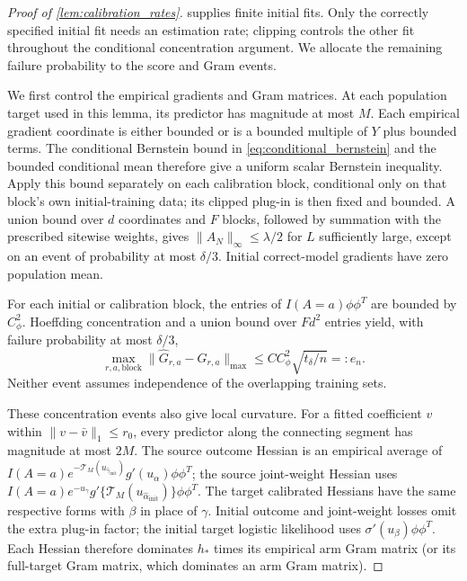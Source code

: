 \documentclass[12pt]{article}
\begin{document}
\begin{proof}[Proof of \cref{lem:calibration_rates}]
 supplies finite initial fits. Only the correctly specified initial fit needs an estimation rate; clipping controls the other fit throughout the conditional concentration argument. We allocate the remaining failure probability to the score and Gram events.

We first control the empirical gradients and Gram matrices. At each population target used in this lemma, its predictor has magnitude at most $M$. Each empirical gradient coordinate is either bounded or is a bounded multiple of $Y$ plus bounded terms. The conditional Bernstein bound in \cref{eq:conditional_bernstein} and the bounded conditional mean therefore give a uniform scalar Bernstein inequality. Apply this bound separately on each calibration block, conditional only on that block's own initial-training data; its clipped plug-in is then fixed and bounded. A union bound over $d$ coordinates and $F$ blocks, followed by summation with the prescribed sitewise weights, gives $\|A_N\|_\infty\le\lambda/2$ for $L$ sufficiently large, except on an event of probability at most $\delta/3$. Initial correct-model gradients have zero population mean.

For each initial or calibration block, the entries of $I(A=a)\phi\phi^T$ are bounded by $C_\phi^2$. Hoeffding concentration and a union bound over $Fd^2$ entries yield, with failure probability at most $\delta/3$,
\begin{equation}\label{eq:gram_concentration}
\max_{r,a,\mathrm{block}}
\|\widehat G_{r,a}-G_{r,a}\|_{\max}
\le C C_\phi^2\sqrt{t_\delta/n}=:e_n.
\end{equation}
Neither event assumes independence of the overlapping training sets.

These concentration events also give local curvature. For a fitted coefficient $v$ within $\|v-\bar v\|_1\le r_0$, every predictor along the connecting segment has magnitude at most $2M$. The source outcome Hessian is an empirical average of
$I(A=a) e^{-\mathcal T_M(u_{\widehat\gamma_{\mathrm{init}}})}g'(u_\alpha)\phi\phi^T$;
the source joint-weight Hessian uses $I(A=a) e^{-u_\gamma}g'\{\mathcal T_M(u_{\widehat\alpha_{\mathrm{init}}})\}\phi\phi^T$.
The target calibrated Hessians have the same respective forms with $\beta$ in place of $\gamma$. Initial outcome and joint-weight losses omit the extra plug-in factor; the initial target logistic likelihood uses $\sigma'(u_\beta)\phi\phi^T$. Each Hessian therefore dominates $h_*$ times its empirical arm Gram matrix (or its full-target Gram matrix, which dominates an arm Gram matrix).


\end{proof}
\end{document}
